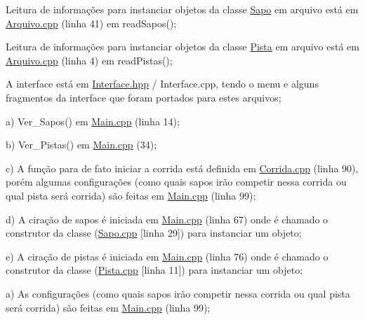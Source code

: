 \begin{DoxyEnumerate}
\item Leitura de informações para instanciar objetos da classe \mbox{\hyperlink{class_sapo}{Sapo}} em arquivo está em \mbox{\hyperlink{_arquivo_8cpp}{Arquivo.\+cpp}} (linha 41) em read\+Sapos();
\item Leitura de informações para instanciar objetos da classe \mbox{\hyperlink{class_pista}{Pista}} em arquivo está em \mbox{\hyperlink{_arquivo_8cpp}{Arquivo.\+cpp}} (linha 4) em read\+Pistas();
\item A interface está em \mbox{\hyperlink{_interface_8hpp}{Interface.\+hpp}} / Interface.\+cpp, tendo o menu e alguns fragmentos da interface que foram portados para estes arquivos;
\end{DoxyEnumerate}
\begin{DoxyEnumerate}
\item a) Ver\+\_\+\+Sapos() em \mbox{\hyperlink{_main_8cpp}{Main.\+cpp}} (linha 14);
\end{DoxyEnumerate}
\begin{DoxyEnumerate}
\item b) Ver\+\_\+\+Pistas() em \mbox{\hyperlink{_main_8cpp}{Main.\+cpp}} (34);
\end{DoxyEnumerate}
\begin{DoxyEnumerate}
\item c) A função para de fato iniciar a corrida está definida em \mbox{\hyperlink{_corrida_8cpp}{Corrida.\+cpp}} (linha 90), porém algumas configurações (como quais sapos irão competir nessa corrida ou qual pista será corrida) são feitas em \mbox{\hyperlink{_main_8cpp}{Main.\+cpp}} (linha 99);
\end{DoxyEnumerate}
\begin{DoxyEnumerate}
\item d) A ciração de sapos é iniciada em \mbox{\hyperlink{_main_8cpp}{Main.\+cpp}} (linha 67) onde é chamado o construtor da classe (\mbox{\hyperlink{_sapo_8cpp}{Sapo.\+cpp}} \mbox{[}linha 29\mbox{]}) para instanciar um objeto;
\end{DoxyEnumerate}
\begin{DoxyEnumerate}
\item e) A ciração de pistas é iniciada em \mbox{\hyperlink{_main_8cpp}{Main.\+cpp}} (linha 76) onde é chamado o construtor da classe (\mbox{\hyperlink{_pista_8cpp}{Pista.\+cpp}} \mbox{[}linha 11\mbox{]}) para instanciar um objeto;
\item a) As configurações (como quais sapos irão competir nessa corrida ou qual pista será corrida) são feitas em \mbox{\hyperlink{_main_8cpp}{Main.\+cpp}} (linha 99);
\end{DoxyEnumerate}
